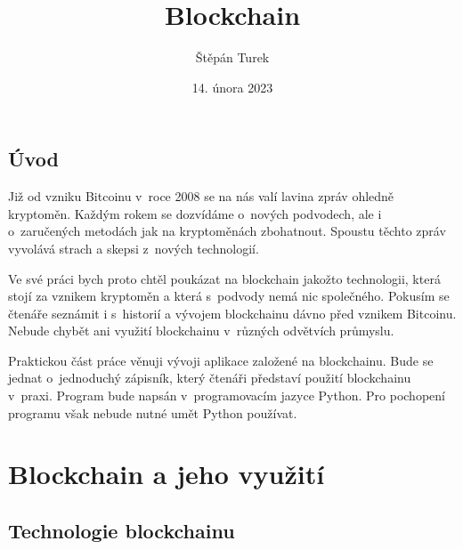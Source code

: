 \documentclass[12pt]{report}			%
\author{Štěpán Turek}
\title{Blockchain}
\date{14. února 2023}
\begin{document}
	\mytitlepage						%
\addtocounter{page}{1}		%
	
	
   \tableofcontents\newpage		%
	

	\chapter*{Úvod}{
Již od vzniku Bitcoinu v~roce 2008 se na nás valí lavina zpráv ohledně kryptoměn. Každým rokem se dozvídáme o~nových podvodech, ale i o~zaručených metodách jak na kryptoměnách zbohatnout. Spoustu těchto zpráv vyvolává strach a skepsi z~nových technologií.

Ve své práci bych proto chtěl poukázat na blockchain jakožto technologii, která stojí za vznikem kryptoměn a která s~podvody nemá nic společného. Pokusím se čtenáře seznámit i s~historií a vývojem blockchainu dávno před vznikem Bitcoinu. Nebude chybět ani využití blockchainu v~různých odvětvích průmyslu. 

Praktickou část práce věnuji vývoji aplikace založené na blockchainu. Bude se jednat o~jednoduchý zápisník, který čtenáři představí použití blockchainu v~praxi. Program bude napsán v~programovacím jazyce Python. Pro pochopení programu však nebude nutné umět Python používat.
}
	\part{Blockchain a jeho využití}
		\chapter{Technologie blockchainu}
\end{document}

